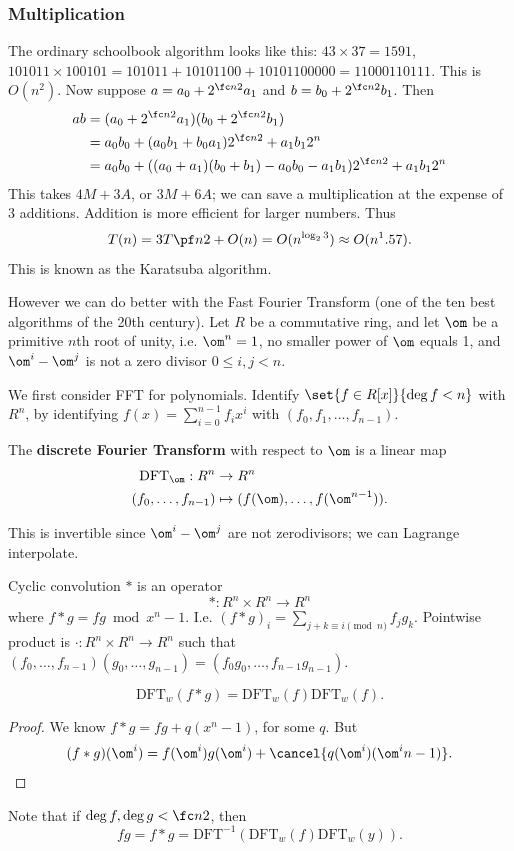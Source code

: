 \subsubsection{Multiplication}
The ordinary schoolbook algorithm looks like this: $43\times 37=1591$, $101011\times 100101=101011+10101100+10101100000=11000110111$. This is $O(n^2)$. Now suppose $a=a_0+2^{\fc n2}a_1$ and $b=b_0+2^{\fc n2}b_1$. Then
\begin{align*}
ab & = (a_0+2^{\fc n2}a_1)(b_0+2^{\fc n2} b_1)\\
&=a_0b_0+(a_0b_1+b_0a_1)2^{\fc n2} +a_1b_12^n\\
&=a_0b_0+((a_0+a_1)(b_0+b_1)-a_0b_0-a_1b_1)2^{\fc n2} +a_1b_12^n
\end{align*}
This takes $4M+3A$, or $3M+6A$; we can save a multiplication at the expense of 3 additions. Addition is more efficient for larger numbers. 
Thus
\[
T(n)=3T\pf n2+O(n)=O(n^{\log_2 3})\approx O(n^1.57).
\]
This is known as the Karatsuba algorithm.

However we can do better with the Fast Fourier Transform (one of the ten best algorithms of the 20th century). Let $R$ be a commutative ring, and let $\om$ be a primitive $n$th root of unity, i.e. $\om^n=1$, no smaller power of $\om$ equals 1, and $\om^i-\om^j$ is not a zero divisor $0\le i,j<n$. %

We first consider FFT for polynomials. Identify $\set{f\in R[x]}{\deg f<n}$ with $R^n$, by identifying $f(x)=\sum_{i=0}^{n-1} f_ix^i$ with $(f_0,f_1,\ldots, f_{n-1})$. 
\begin{df}The \textbf{discrete Fourier Transform} with respect to $\om$ is a linear map 
\begin{align*}
\text{DFT}_{\om}:R^n&\to R^n\\
(f_0,\ldots, f_{n-1}) &\mapsto (f(\om),\ldots, f(\om^{n-1})).
\end{align*}
\end{df}
This is invertible since $\om^i-\om^j$ are not zerodivisors; we can Lagrange interpolate.
\begin{df}
Cyclic convolution $*$ is an operator
\[
*:R^n\times R^n \to R^n
\]
where $f*g=fg\bmod{x^n-1}$. I.e. $(f*g)_i=\sum_{j+k\equiv i\pmod n} f_jg_k$. Pointwise product is $\cdot:R^n\times R^n\to R^n$ such that $(f_0,\ldots, f_{n-1})(g_0,\ldots, g_{n-1})=(f_0g_0,\ldots, f_{n-1}g_{n-1})$.
\end{df}
\begin{thm}
\[\text{DFT}_w(f*g)=\text{DFT}_w(f)\text{DFT}_w(f).\]
\end{thm}
\begin{proof}
We know $f*g=fg+q(x^n-1)$, for some $q$. But
\[
(f*g)(\om^i)=f(\om^i)g(\om^i)+\cancel{q(\om^i)(\om^in-1)}.
\]
\end{proof}
Note that if $\deg f,\deg g<\fc n2$, then \[fg=f*g=\text{DFT}^{-1}(\text{DFT}_w(f)\text{DFT}_w(y)).\]

